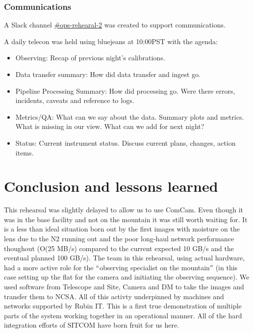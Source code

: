\subsubsection{Communications }


A Slack channel \href{https://lsstc.slack.com/messages/CJBSY6FUN}{\#ops-rehearal-2} was created to support communications.

A daily telecon was held using bluejeans at 10:00PST with the agenda:
\begin{itemize}
\item Observing: Recap of previous night's calibrations.
\item Data transfer summary:  How did data transfer and ingest go.
\item Pipeline Processing Summary: 	How did processing go.  Were there errors, incidents, caveats and reference to logs.
\item Metrics/QA:  What can we say about the data. Summary plots and metrics.  What is missing in our view. What can we add for next night?
\item Status:   Current instrument status.  Discuss current plans, changes, action items.

\end{itemize}







\section{Conclusion and lessons learned}\label{sec:conc}
This rehearsal was slightly delayed to allow us to use ComCam. Even though it was in the base facility and not on 
the mountain it was still worth waiting for.
It is a less than ideal situation born out by the first images with moisture on the lens due to the N2 running out
and the poor long-haul network performance thoughout (O(25 MB/s) compared to the current expected 10 GB/s and the
eventual planned 100 GB/s).
The team in this rehearsal, using actual hardware, had a more active role for the $``$observing specialist on the mountain$''$ (in this case setting up the flat for the camera and initiating the observing sequence).
We used software from Telescope and Site, Camera and DM to take the images and transfer them to NCSA.
All of this activty underpinned by machines and networks supported by Rubin IT.
This is a first true demonstration of multiple parts of the system working together in an operational manner.
All of the hard integration efforts of SITCOM have born fruit for us here.

